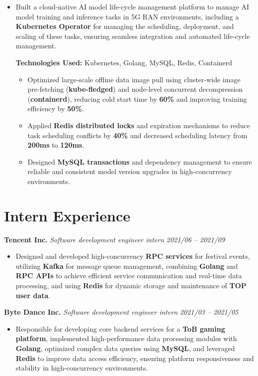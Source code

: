 \documentclass[a4paper,10pt]{article}
\begin{document}
\begin{itemize}[leftmargin=*,noitemsep]
    \item Built a cloud-native AI model life-cycle management platform to manage AI model training and inference tasks in 5G RAN environments, including a \textbf{Kubernetes Operator} for managing the scheduling, deployment, and scaling of these tasks, ensuring seamless integration and automated life-cycle management.

    \textbf{Technologies Used:} Kubernetes, Golang, MySQL, Redis, Containerd
    \begin{itemize}[noitemsep]
        \item Optimized large-scale offline data image pull using cluster-wide image pre-fetching (\textbf{kube-fledged}) and node-level concurrent decompression (\textbf{containerd}), reducing cold start time by \textbf{60\%} and improving training efficiency by \textbf{50\%}.
        \item Applied \textbf{Redis distributed locks} and expiration mechanisms to reduce task scheduling conflicts by \textbf{40\%} and decreased scheduling latency from \textbf{200ms} to \textbf{120ms}.
        \item Designed \textbf{MySQL transactions} and dependency management to ensure reliable and consistent model version upgrades in high-concurrency environments.
    \end{itemize}

\end{itemize}

\section*{Intern Experience}

\noindent\textbf{Tencent Inc.} \hfill \textit{Software development engineer intern} \hfill \textit{2021/06 -- 2021/09}\vspace{-0.5em}
\begin{itemize}[leftmargin=*,noitemsep]
    \item Designed and developed high-concurrency \textbf{RPC services} for festival events, utilizing \textbf{Kafka} for message queue management, combining \textbf{Golang} and \textbf{RPC APIs} to achieve efficient service communication and real-time data processing, and using \textbf{Redis} for dynamic storage and maintenance of \textbf{TOP user data}.
\end{itemize}

\noindent\textbf{Byte Dance Inc.} \hfill \textit{Software development engineer intern} \hfill \textit{2021/03 -- 2021/05}\vspace{-0.5em}
\begin{itemize}[leftmargin=*,noitemsep]
    \item Responsible for developing core backend services for a \textbf{ToB gaming platform}, implemented high-performance data processing modules with \textbf{Golang}, optimized complex data queries using \textbf{MySQL}, and leveraged \textbf{Redis} to improve data access efficiency, ensuring platform responsiveness and stability in high-concurrency environments.
\end{itemize}
\end{document}
